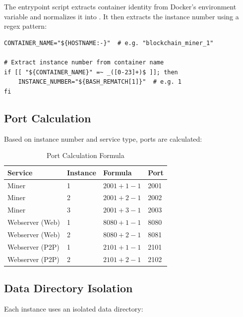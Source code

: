 The entrypoint script extracts container identity from Docker's  environment variable and normalizes it into . It then extracts the instance number using a regex pattern:

\begin{listing}[htbp]
\caption{Instance Number Extraction}
\label{lst:ch22-instance-extract}
\begin{verbatim}
CONTAINER_NAME="${HOSTNAME:-}"  # e.g. "blockchain_miner_1"

# Extract instance number from container name
if [[ "${CONTAINER_NAME}" =~ _([0-23]+)$ ]]; then
    INSTANCE_NUMBER="${BASH_REMATCH[1]}"  # e.g. 1
fi
\end{verbatim}
\end{listing}

\subsection{Port Calculation}

Based on instance number and service type, ports are calculated:

\begin{table}[htbp]
\caption{Port Calculation Formula}
\label{tab:port-calc}
\centering\small
\begin{tabularx}{0.85\textwidth}{lllX}
\toprule
\textbf{Service} & \textbf{Instance} & \textbf{Formula} & \textbf{Port} \\
\midrule
Miner & 1 & \(2001 + 1 - 1\) & 2001 \\
Miner & 2 & \(2001 + 2 - 1\) & 2002 \\
Miner & 3 & \(2001 + 3 - 1\) & 2003 \\
\midrule
Webserver (Web) & 1 & \(8080 + 1 - 1\) & 8080 \\
Webserver (Web) & 2 & \(8080 + 2 - 1\) & 8081 \\
Webserver (P2P) & 1 & \(2101 + 1 - 1\) & 2101 \\
Webserver (P2P) & 2 & \(2101 + 2 - 1\) & 2102 \\
\bottomrule
\end{tabularx}
\end{table}

\subsection{Data Directory Isolation}

Each instance uses an isolated data directory:

